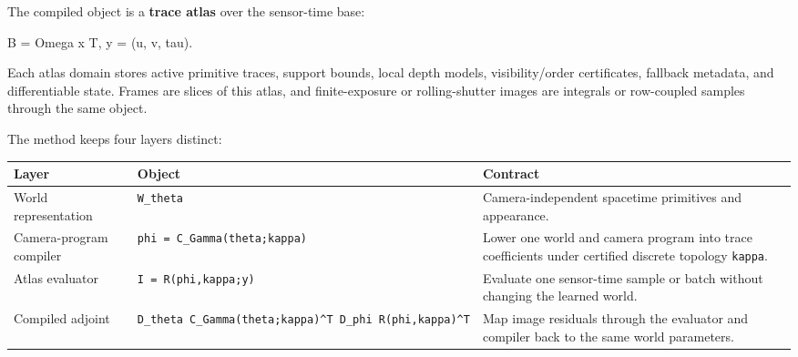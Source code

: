 \documentclass[
]{article}
\newenvironment{Shaded}{}{}
\newcommand{\NormalTok}[1]{#1}
\newcounter{none} %
\begin{document}
The compiled object is a \textbf{trace atlas} over the sensor-time base:

\begin{Shaded}
\begin{Highlighting}[]
\NormalTok{B = Omega x T,      y = (u, v, tau).}
\end{Highlighting}
\end{Shaded}

Each atlas domain stores active primitive traces, support bounds, local
depth models, visibility/order certificates, fallback metadata, and
differentiable state. Frames are slices of this atlas, and
finite-exposure or rolling-shutter images are integrals or row-coupled
samples through the same object.

The method keeps four layers distinct:

{\def\LTcaptype{none} %
\begin{longtable}[]{@{}
  >{\raggedright\arraybackslash}p{}
  >{\raggedright\arraybackslash}p{}
  >{\raggedright\arraybackslash}p{}@{}}
\toprule\noalign{}
\begin{minipage}[b]{\linewidth}\raggedright
Layer
\end{minipage} & \begin{minipage}[b]{\linewidth}\raggedright
Object
\end{minipage} & \begin{minipage}[b]{\linewidth}\raggedright
Contract
\end{minipage} \\
\midrule\noalign{}
\endhead
\bottomrule\noalign{}
\endlastfoot
World representation & \texttt{W\_theta} & Camera-independent spacetime
primitives and appearance. \\
Camera-program compiler & \texttt{phi\ =\ C\_Gamma(theta;kappa)} & Lower
one world and camera program into trace coefficients under certified
discrete topology \texttt{kappa}. \\
Atlas evaluator & \texttt{I\ =\ R(phi,kappa;y)} & Evaluate one
sensor-time sample or batch without changing the learned world. \\
Compiled adjoint &
\texttt{D\_theta\ C\_Gamma(theta;kappa)\^{}T\ D\_phi\ R(phi,kappa)\^{}T}
& Map image residuals through the evaluator and compiler back to the
same world parameters. \\
\end{longtable}
}
\end{document}
